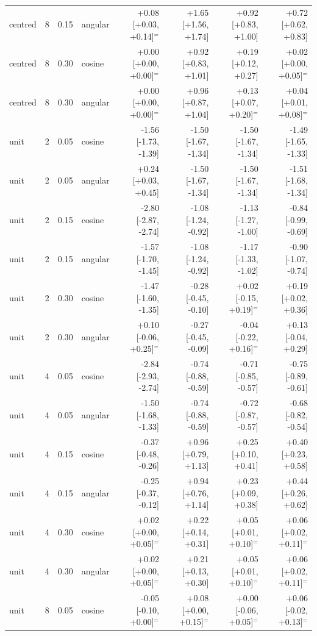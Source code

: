 \begin{tabular}{lrrlrrrr}
centred & 8 & 0.15 & angular & +0.08 [+0.03, +0.14]$^{=}$ & +1.65 [+1.56, +1.74] & +0.92 [+0.83, +1.00] & +0.72 [+0.62, +0.83] \\
centred & 8 & 0.30 & cosine & +0.00 [+0.00, +0.00]$^{=}$ & +0.92 [+0.83, +1.01] & +0.19 [+0.12, +0.27] & +0.02 [+0.00, +0.05]$^{=}$ \\
centred & 8 & 0.30 & angular & +0.00 [+0.00, +0.00]$^{=}$ & +0.96 [+0.87, +1.04] & +0.13 [+0.07, +0.20]$^{=}$ & +0.04 [+0.01, +0.08]$^{=}$ \\
unit & 2 & 0.05 & cosine & -1.56 [-1.73, -1.39] & -1.50 [-1.67, -1.34] & -1.50 [-1.67, -1.34] & -1.49 [-1.65, -1.33] \\
unit & 2 & 0.05 & angular & +0.24 [+0.03, +0.45] & -1.50 [-1.67, -1.34] & -1.50 [-1.67, -1.34] & -1.51 [-1.68, -1.34] \\
unit & 2 & 0.15 & cosine & -2.80 [-2.87, -2.74] & -1.08 [-1.24, -0.92] & -1.13 [-1.27, -1.00] & -0.84 [-0.99, -0.69] \\
unit & 2 & 0.15 & angular & -1.57 [-1.70, -1.45] & -1.08 [-1.24, -0.92] & -1.17 [-1.33, -1.02] & -0.90 [-1.07, -0.74] \\
unit & 2 & 0.30 & cosine & -1.47 [-1.60, -1.35] & -0.28 [-0.45, -0.10] & +0.02 [-0.15, +0.19]$^{=}$ & +0.19 [+0.02, +0.36] \\
unit & 2 & 0.30 & angular & +0.10 [-0.06, +0.25]$^{=}$ & -0.27 [-0.45, -0.09] & -0.04 [-0.22, +0.16]$^{=}$ & +0.13 [-0.04, +0.29] \\
unit & 4 & 0.05 & cosine & -2.84 [-2.93, -2.74] & -0.74 [-0.88, -0.59] & -0.71 [-0.85, -0.57] & -0.75 [-0.89, -0.61] \\
unit & 4 & 0.05 & angular & -1.50 [-1.68, -1.33] & -0.74 [-0.88, -0.59] & -0.72 [-0.87, -0.57] & -0.68 [-0.82, -0.54] \\
unit & 4 & 0.15 & cosine & -0.37 [-0.48, -0.26] & +0.96 [+0.79, +1.13] & +0.25 [+0.10, +0.41] & +0.40 [+0.23, +0.58] \\
unit & 4 & 0.15 & angular & -0.25 [-0.37, -0.12] & +0.94 [+0.76, +1.14] & +0.23 [+0.09, +0.38] & +0.44 [+0.26, +0.62] \\
unit & 4 & 0.30 & cosine & +0.02 [+0.00, +0.05]$^{=}$ & +0.22 [+0.14, +0.31] & +0.05 [+0.01, +0.10]$^{=}$ & +0.06 [+0.02, +0.11]$^{=}$ \\
unit & 4 & 0.30 & angular & +0.02 [+0.00, +0.05]$^{=}$ & +0.21 [+0.13, +0.30] & +0.05 [+0.01, +0.10]$^{=}$ & +0.06 [+0.02, +0.11]$^{=}$ \\
unit & 8 & 0.05 & cosine & -0.05 [-0.10, +0.00]$^{=}$ & +0.08 [+0.00, +0.15]$^{=}$ & +0.00 [-0.06, +0.05]$^{=}$ & +0.06 [-0.02, +0.13]$^{=}$ \\

\end{tabular}
